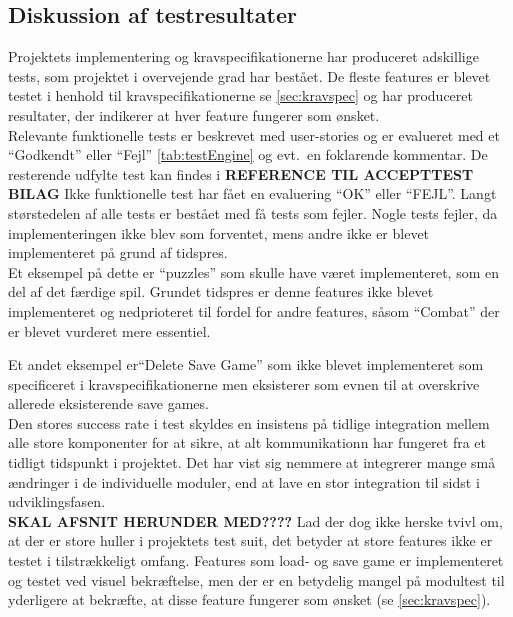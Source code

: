 \subsection{Diskussion af testresultater}
Projektets implementering og kravspecifikationerne har produceret adskillige tests, som 
projektet i overvejende grad har bestået. De fleste features er blevet
testet i henhold til kravspecifikationerne se \autoref{sec:kravspec} og har produceret 
resultater, der indikerer at hver feature fungerer som ønsket. \\

Relevante funktionelle tests er beskrevet med user-stories og er evalueret med et ``Godkendt''
eller ``Fejl'' \autoref{tab:testEngine} og evt.\ en foklarende kommentar. De resterende udfylte test kan findes i \textbf{REFERENCE TIL ACCEPTTEST BILAG}
Ikke funktionelle 
test har fået en evaluering ``OK'' eller ``FEJL''.
Langt størstedelen af alle tests er bestået med få tests som fejler. 
Nogle tests fejler, da implementeringen ikke blev som forventet, mens andre ikke er blevet 
implementeret på grund af tidspres. \\

Et eksempel på dette er ``puzzles'' som skulle have været implementeret, som en del af det færdige spil.
Grundet tidspres er denne features ikke blevet implementeret og
nedprioteret til fordel for andre features, såsom ``Combat'' der er blevet vurderet mere essentiel.

Et andet eksempel er``Delete Save Game'' som ikke blevet implementeret som specificeret i kravspecifikationerne men
eksisterer som evnen til at overskrive allerede eksisterende save games.\\
Den stores success rate i test skyldes en insistens på tidlige integration mellem alle store komponenter for at sikre, at 
alt kommunikationn har fungeret fra et tidligt 
tidspunkt i projektet. Det har vist sig nemmere at integrerer mange små ændringer i de individuelle moduler, end at lave en stor integration til sidst i udviklingsfasen.\\

\textbf{SKAL AFSNIT HERUNDER MED????}
Lad der dog ikke herske tvivl om, at der er store huller i projektets test suit, det
betyder at store features ikke er testet i tilstrækkeligt omfang. Features som load- og save game er implementeret og testet ved visuel bekræftelse, men der er en betydelig mangel på modultest til yderligere at bekræfte, at disse feature fungerer som ønsket (se \autoref{sec:kravspec}). \\

